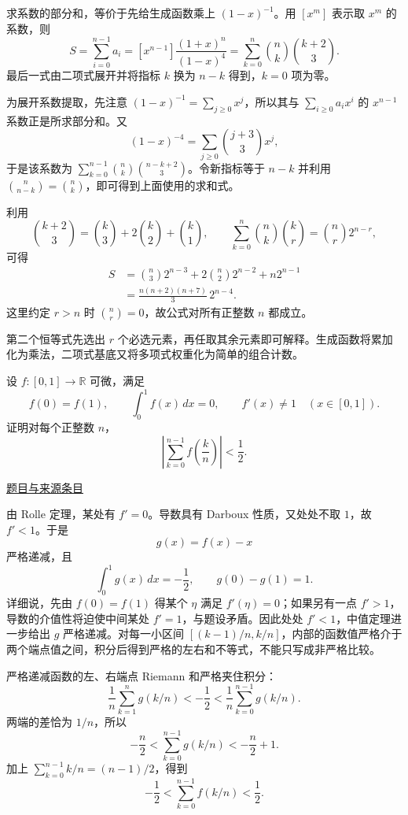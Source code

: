 \documentclass[UTF8,12pt,a4paper,fontset=fandol]{ctexart}
\begin{document}
\begin{solve}\label{ans:pre04-math:5}

求系数的部分和，等价于先给生成函数乘上 $(1-x)^{-1}$。用 $[x^m]$ 表示取 $x^m$ 的系数，则
\[
S=\sum_{i=0}^{n-1}a_i
=[x^{n-1}]\frac{(1+x)^n}{(1-x)^4}
=\sum_{k=0}^n\binom nk\binom{k+2}{3}.
\]
最后一式由二项式展开并将指标 $k$ 换为 $n-k$ 得到，$k=0$ 项为零。

为展开系数提取，先注意 $(1-x)^{-1}=\sum_{j\ge0}x^j$，所以其与 $\sum_{i\ge0}a_ix^i$ 的 $x^{n-1}$ 系数正是所求部分和。又
\[
(1-x)^{-4}=\sum_{j\ge0}\binom{j+3}{3}x^j,
\]
于是该系数为 $\sum_{k=0}^{n-1}\binom nk\binom{n-k+2}{3}$。令新指标等于 $n-k$ 并利用 $\binom n{n-k}=\binom nk$，即可得到上面使用的求和式。

利用
\[
\binom{k+2}{3}=\binom k3+2\binom k2+\binom k1,
\qquad
\sum_{k=0}^n\binom nk\binom kr=\binom nr2^{n-r},
\]
可得
\[
\begin{aligned}
S
&=\binom n3 2^{n-3}+2\binom n2 2^{n-2}+n2^{n-1}\\
&=\boxed{\frac{n(n+2)(n+7)}3\,2^{n-4}}.
\end{aligned}
\]
这里约定 $r>n$ 时 $\binom nr=0$，故公式对所有正整数 $n$ 都成立。

\end{solve}

\begin{remark}[方法与条件]第二个恒等式先选出 $r$ 个必选元素，再任取其余元素即可解释。生成函数将累加化为乘法，二项式基底又将多项式权重化为简单的组合计数。\end{remark}

\begin{example}[来源序号6]\label{ex:pre04-math:6}\label{pr:pre04-math:6}

设 $f:[0,1]\to\mathbb R$ 可微，满足
\[
f(0)=f(1),\qquad \int_0^1f(x)\,dx=0,
\qquad f'(x)\ne1\quad(x\in[0,1]).
\]
证明对每个正整数 $n$，
\[
\left|\sum_{k=0}^{n-1}f\left(\frac kn\right)\right|<\frac12.
\]

\par\href{https://github.com/lzxcr/cmc-mathematics/blob/64916fa1fdbc3e444a652eca204d5669058ee321/src/problems/preliminary/04/06.md}{题目与来源条目}

\end{example}

\begin{solve}\label{ans:pre04-math:6}

由 Rolle 定理，某处有 $f'=0$。导数具有 Darboux 性质，又处处不取 $1$，故 $f'<1$。于是
\[
g(x)=f(x)-x
\]
严格递减，且
\[
\int_0^1g(x)\,dx=-\frac12,\qquad g(0)-g(1)=1.
\]
详细说，先由 $f(0)=f(1)$ 得某个 $\eta$ 满足 $f'(\eta)=0$；如果另有一点 $f'>1$，导数的介值性将迫使中间某处 $f'=1$，与题设矛盾。因此处处 $f'<1$，中值定理进一步给出 $g$ 严格递减。对每一小区间 $[(k-1)/n,k/n]$，内部的函数值严格介于两个端点值之间，积分后得到严格的左右和不等式，不能只写成非严格比较。

严格递减函数的左、右端点 Riemann 和严格夹住积分：
\[
\frac1n\sum_{k=1}^{n}g(k/n)
< -\frac12
<\frac1n\sum_{k=0}^{n-1}g(k/n).
\]
两端的差恰为 $1/n$，所以
\[
-\frac n2<\sum_{k=0}^{n-1}g(k/n)<-\frac n2+1.
\]
加上 $\sum_{k=0}^{n-1}k/n=(n-1)/2$，得到
\[
-\frac12<\sum_{k=0}^{n-1}f(k/n)<\frac12.
\]

\end{solve}
\end{document}
